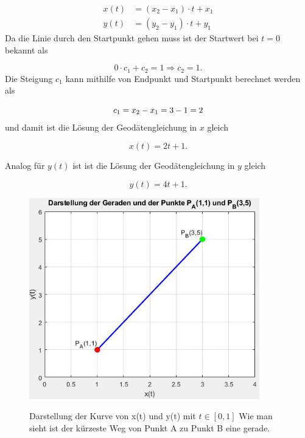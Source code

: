 \begin{align}
	x(t) &= (x_2 - x_1) \cdot t + x_1 \\
	y(t) &= (y_2 - y_1) \cdot t + y_1
\end{align}
Da die Linie durch den Startpunkt gehen muss ist der Startwert bei $t=0$ bekannt als
 
\begin{equation}
	0 \cdot c_1 + c_2 = 1 \Rightarrow c_2 = 1 .	
\end{equation}
Die Steigung $c_1$ kann mithilfe von Endpunkt und Startpunkt berechnet werden als

\begin{equation}
	c_1 = x_2 - x_1 \\ = 3-1 \\ = 2
\end{equation}
und damit ist die Lösung der Geodätengleichung in $x$ gleich

\begin{equation}
	x(t) = 2t + 1 .
\end{equation}

Analog für $y(t)$ ist ist die Lösung der Geodätengleichung in $y$ gleich

\begin{equation}
	y(t) = 4t + 1 .
\end{equation}

\begin{figure}
	\centering
	\includegraphics[width=10cm]{papers/geodaeten/Abbildungen/Standardverfahren/Kartesisch}
	\label{geodaeten:figure:Standardverfahren:Kartesisch:figure1}
	\caption{Darstellung der Kurve von x(t) und y(t) mit $t \in [0 , 1]$ Wie man sieht ist der kürzeste Weg von Punkt A zu Punkt B eine gerade.}
\end{figure}
